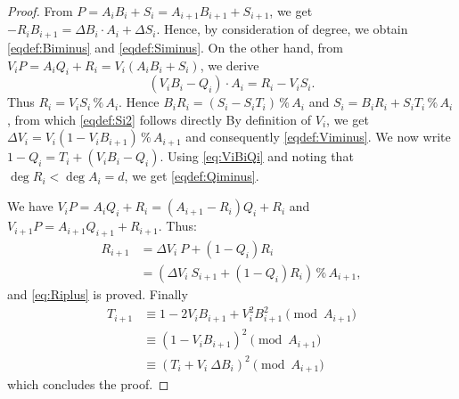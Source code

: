 \documentclass{sig-alternate-05-2015}
\renewcommand{\mod}{\,\%\,}
\def\todo#1{\ \!\!{\color{red} #1}}
\begin{document}
\begin{proof}
From $P= A_i B_i + S_i= A_{i+1} B_{i+1} + S_{i+1}$, we get
$- R_i B_{i+1}= \Delta B_i \cdot A_i + \Delta S_i$.
Hence, by consideration of degree, we obtain \eqref{eqdef:Biminus} 
and \eqref{eqdef:Siminus}.
On the other hand, from $V_i P = A_i Q_i + R_i=V_i (A_i B_i + S_i)$, we 
derive
\begin{equation}
\label{eq:ViBiQi} 
(V_i B_i -Q_i) \cdot A_i=R_i-V_i S_i. 
\end{equation} 
Thus $R_i=V_i S_i \mod A_i$.
Hence $B_i R_i = (S_i - S_i T_i) \mod A_i$ and $S_i = B_i R_i + S_i T_i 
\mod A_i$, from which \eqref{eqdef:Si2} follows directly 
By definition of $V_i$, we get $\Delta V_i = V_i (1-V_i B_{i+1}) \mod A_{i+1}$ and consequently \eqref{eqdef:Viminus}.
We now write $1-Q_i= T_i + (V_i B_i - Q_i)$. Using \eqref{eq:ViBiQi} and
noting that $\deg R_i < \deg A_i = d$, we 
get \eqref{eqdef:Qiminus}.

We have $V_i P=A_i Q_i+R_i=(A_{i+1}-R_i)Q_i+R_i$ and $V_{i+1} P=A_{i+1} 
Q_{i+1}+R_{i+1}$. Thus:
\begin{align*}
R_{i+1} &= \Delta V_i \: P + (1-Q_i)R_i \\
 &= (\Delta V_i \: S_{i+1} + (1-Q_i)R_i) \mod A_{i+1},
\end{align*} 
and \eqref{eq:Riplus} is proved. Finally
\begin{align*}
T_{i+1} &\equiv 1-2V_i B_{i+1}+V_i^2 B_{i+1}^2 \pmod {A_{i+1}} \\
&\equiv (1-V_i B_{i+1})^2 \pmod {A_{i+1}} \\
&\equiv (T_i + V_i \: \Delta B_i)^2 \pmod {A_{i+1}}
\end{align*}
which concludes the proof.
\end{proof}
\end{document}
